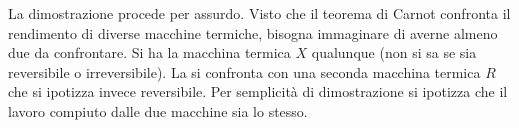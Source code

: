 \documentclass[10pt,a4paper]{book}
\begin{document}
La dimostrazione procede per assurdo. Visto che il teorema di Carnot confronta il rendimento di diverse macchine termiche, bisogna immaginare di averne almeno due da confrontare. Si ha la macchina termica $X$ qualunque (non si sa se sia reversibile o irreversibile). La si confronta con una seconda macchina termica $R$ che si ipotizza invece reversibile. Per semplicità di dimostrazione si ipotizza che il lavoro compiuto dalle due macchine sia lo stesso.
\begin{figure}[htpb]
	\centering
	


	\begin{tikzpicture}[x=0.75pt,y=0.75pt,yscale=-1,xscale=1]


\end{tikzpicture}
\end{figure}
\end{document}
